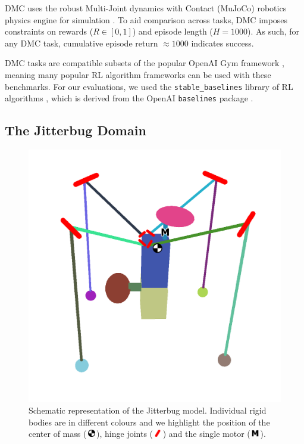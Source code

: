 \documentclass[letterpaper, 10 pt, conference]{ieeeconf}
\newcommand{\com}{\,\includegraphics[width=9pt]{ico-com}\,}
\newcommand{\hinge}{\,\includegraphics[width=9pt]{ico-hinge}\,}
\newcommand{\motor}{\,\includegraphics[width=9pt]{ico-motor}\,}
\begin{document}
DMC uses the robust Multi-Joint dynamics with Contact (MuJoCo) robotics physics engine for simulation \cite{Todorov2012MuJoCo}.
To aid comparison across tasks, DMC imposes constraints on rewards ($R \in [0, 1]$) and episode length ($H = 1000$).
As such, for any DMC task, cumulative episode return $\approx 1000$ indicates success.

DMC tasks are compatible subsets of the popular OpenAI Gym framework \cite{Brockman2016Gym}, meaning many popular RL algorithm frameworks can be used with these benchmarks.
For our evaluations, we used the \texttt{stable\_baselines} library of RL algorithms \cite{Hill2018Stable}, which is derived from the OpenAI \texttt{baselines} package \cite{Dhariwal2017Baselines}.

\subsection{The Jitterbug Domain}

\begin{figure}[t]
    \centering
    \includegraphics[width=\linewidth]{fig-jitterbug-parts}
    \caption[
        Schematic representation of the Jitterbug model.
        Individual rigid bodies are in different colours and we highlight the position of the center of mass, hinge joints and the single motor.
    ]{
        Schematic representation of the Jitterbug model.
        Individual rigid bodies are in different colours and we highlight the position of the center of mass (\protect\com), hinge joints  (\protect\hinge) and the single motor (\protect\motor).
    }
    \label{fig:parts}
\end{figure}
\end{document}
